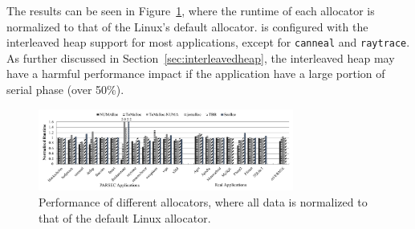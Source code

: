 

 The results can be seen in Figure~\ref{fig:perf}, where the runtime of each allocator is normalized to that of the Linux's default allocator. \NM{} is configured with the interleaved heap support for most applications, except for \texttt{canneal} and \texttt{raytrace}. As further discussed in Section~\ref{sec:interleavedheap}, the interleaved heap may have a harmful performance impact if the application have a large portion of serial phase (over 50\%).


\begin{figure}[!ht]
    \centering
   
    \includegraphics[width=3.3in]{figure/8-node-parsec-perf.pdf}
    \caption{Performance of different allocators, where all data is normalized to that of the default Linux allocator. \label{fig:perf}}
 \end{figure}


